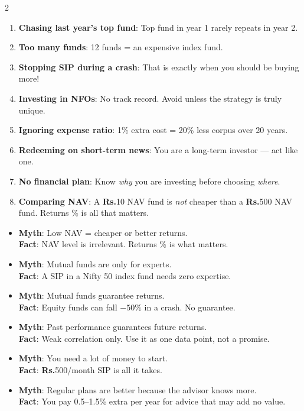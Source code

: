 \documentclass[11pt,a4paper]{article}
\newcommand{\rupee}{\textbf{\textsf{Rs.}}}
\begin{document}
\begin{multicols}{2}

\begin{warnbox}[title=\ding{56}\ Mistakes Beginners Make]
\begin{enumerate}
  \item \textbf{Chasing last year's top fund}: Top fund in year 1 rarely repeats in year 2.
  \item \textbf{Too many funds}: 12 funds = an expensive index fund.
  \item \textbf{Stopping SIP during a crash}: That is exactly when you should be buying more!
  \item \textbf{Investing in NFOs}: No track record.  Avoid unless the strategy is truly unique.
  \item \textbf{Ignoring expense ratio}: 1\% extra cost = 20\% less corpus over 20 years.
  \item \textbf{Redeeming on short-term news}: You are a long-term investor --- act like one.
  \item \textbf{No financial plan}: Know \emph{why} you are investing before choosing \emph{where}.
  \item \textbf{Comparing NAV}: A \rupee{}10 NAV fund is \emph{not} cheaper than a \rupee{}500 NAV fund.  Returns \% is all that matters.
\end{enumerate}
\end{warnbox}

\columnbreak

\begin{warnbox}[title=\ding{56}\ Myths Debunked]
\begin{itemize}
  \item \textbf{Myth}: Low NAV = cheaper or better returns.\\
    \textbf{Fact}: NAV level is irrelevant. Returns \% is what matters.
  \item \textbf{Myth}: Mutual funds are only for experts.\\
    \textbf{Fact}: A SIP in a Nifty 50 index fund needs zero expertise.
  \item \textbf{Myth}: Mutual funds guarantee returns.\\
    \textbf{Fact}: Equity funds can fall $-50\%$ in a crash.  No guarantee.
  \item \textbf{Myth}: Past performance guarantees future returns.\\
    \textbf{Fact}: Weak correlation only.  Use it as one data point, not a promise.
  \item \textbf{Myth}: You need a lot of money to start.\\
    \textbf{Fact}: \rupee{}500/month SIP is all it takes.
  \item \textbf{Myth}: Regular plans are better because the advisor knows more.\\
    \textbf{Fact}: You pay 0.5--1.5\% extra per year for advice that may add no value.
\end{itemize}
\end{warnbox}

\end{multicols}
\end{document}
